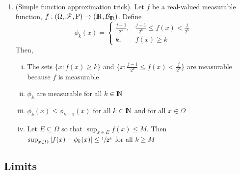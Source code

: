 \documentclass[a4paper,10pt]{scrbook}
\begin{document}
\begin{enumerate}
  \item (Simple function approximation trick).         
        Let $f$ be a real-valued measurable function, $f:\ofp\to(\Re,\mathcal{B}_\Re)$. Define
        \[
         \phi_k(x) = \begin{cases}
                   \frac{j-1}{2^k},   &\frac{j-1}{2^k}\leq f(x) < \frac{j}{2^k}\\
                   k,                 &f(x) \geq k 
                  \end{cases}
        \]
        Then,
        \begin{enumerate}[i.]
         \item The sets $\{x: f(x) \geq k\}$ and $\{x: \frac{j-1}{2^k}\leq f(x) < \frac{j}{2^k}\}$ are measurable because $f$ is measurable
         \item $\phi_k$ are measurable for all $k\in\N$
         \item $\phi_k(x) \leq \phi_{k+1}(x)$ for all $k\in\N$ and for all $x\in\Omega$
         \item Let $E\subseteq \Omega$ so that $\sup_{x\in E}f(x) \leq M$. Then $\sup_{x\in\Omega}|f(x) - \phi_k(x)|\leq \nicefrac{1}{2^k}$ for all $k\geq M$
        \end{enumerate}

\end{enumerate}

\subsection{Limits}
\end{document}
